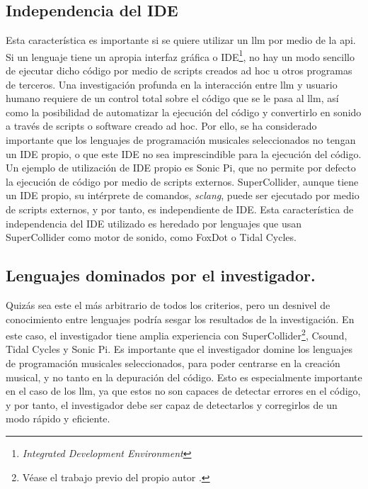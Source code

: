 \subsection{Independencia del IDE}
Esta característica es importante si se quiere utilizar un \gls{llm} por medio de la \gls{api}. Si un lenguaje tiene un apropia interfaz gráfica o IDE\footnote{\emph{Integrated Development Environment}}, no hay un modo sencillo de ejecutar dicho código por medio de scripts creados ad hoc u otros programas de terceros. Una investigación profunda en la interacción entre \gls{llm} y usuario humano requiere de un control total sobre el código que se le pasa al \gls{llm}, así como la posibilidad de automatizar la ejecución del código y convertirlo en sonido a través de scripts o software creado ad hoc. Por ello, se ha considerado importante que los lenguajes de programación musicales seleccionados no tengan un IDE propio, o que este IDE no sea imprescindible para la ejecución del código. Un ejemplo de utilización de IDE propio es {Sonic Pi}, que no permite por defecto la ejecución de código por medio de scripts externos. {SuperCollider}, aunque tiene un IDE propio, su intérprete de comandos, \emph{sclang}, puede ser ejecutado por medio de scripts externos, y por tanto, es independiente de IDE. Esta característica de independencia del IDE utilizado es heredado por lenguajes que usan {SuperCollider} como motor de sonido, como {FoxDot} o {Tidal Cycles}.

\subsection{Lenguajes dominados por el investigador.} 
Quizás sea este el más arbitrario de todos los criterios, pero un desnivel de conocimiento entre lenguajes podría sesgar los resultados de la investigación. En este caso, el investigador tiene amplia experiencia con {SuperCollider}\footnote{Véase el trabajo previo del propio autor \citep{guerraparraMesjetiuTFM_Arte_Sonoro_MEMORIA2020}.}, {Csound}, {Tidal Cycles} y {Sonic Pi}.
Es importante que el investigador domine los lenguajes de programación musicales seleccionados, para poder centrarse en la creación musical, y no tanto en la depuración del código. Esto es especialmente importante en el caso de los \gls{llm}, ya que estos no son capaces de detectar errores en el código, y por tanto, el investigador debe ser capaz de detectarlos y corregirlos de un modo rápido y eficiente.

